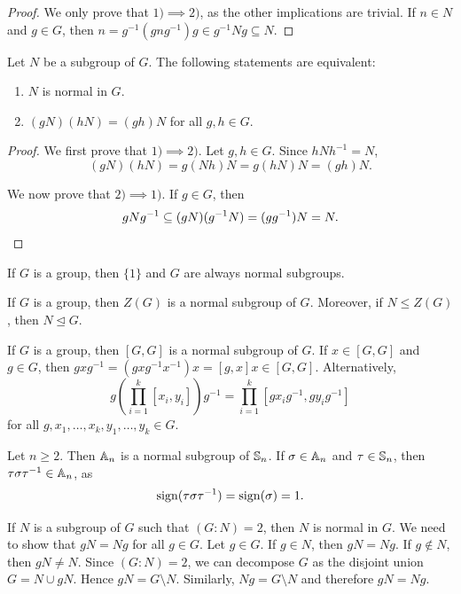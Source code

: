 \begin{proof}
We only prove that $1)\implies 2)$, as the other implications are trivial. If $n\in N$ and $g\in G$, then 
$n=g^{-1}(gng^{-1})g\in g^{-1}Ng\subseteq N$. 
\end{proof}

\begin{proposition}
    Let $N$ be a subgroup of $G$. The following statements
    are equivalent: 
    \begin{enumerate}
        \item $N$ is normal in $G$.
        \item $(gN)(hN)=(gh)N$ for all $g,h\in G$.
    \end{enumerate}
\end{proposition}

\begin{proof}
   We first prove that $1)\implies 2)$. Let $g,h\in G$. Since
   $hNh^{-1}=N$, 
   \[
   (gN)(hN)=g(Nh)N=g(hN)N=(gh)N.
   \]
   
   We now prove that $2)\implies1)$. If $g\in G$, then
    \[
    gNg^{-1}\subseteq (gN)(g^{-1}N)=(gg^{-1})N=N.\qedhere
    \]
\end{proof}

If $G$ is a group, then 
$\{1\}$ and $G$ are always normal subgroups. 

\begin{example}
If $G$ is a group, then $Z(G)$ is a normal subgroup of $G$. Moreover, 
if $N\leq Z(G)$, then $N\unlhd
G$.
\end{example}

\begin{example}
  If $G$ is a group, then  $[G,G]$ is a normal subgroup of $G$. If
  $x\in [G,G]$ and $g\in G$, then
  $gxg^{-1}=(gxg^{-1}x^{-1})x=[g,x]x\in [G,G]$. Alternatively,
  \[
    g\left(\prod_{i=1}^k[x_i,y_i]\right)g^{-1}=\prod_{i=1}^k [gx_ig^{-1},gy_ig^{-1}]
  \]
  for all $g,x_1,\dots,x_k,y_1,\dots,y_k\in G$.
\end{example}

\begin{example}
  Let $n\geq2$. Then
  $\mathbb{A}_n$ is a normal subgroup of $\mathbb{S}_n$.
  If $\sigma\in\mathbb{A}_n$ and $\tau\in\mathbb{S}_n$, then $\tau\sigma\tau^{-1}\in\mathbb{A}_n$, as
  \[
    \operatorname{sign}(\tau\sigma\tau^{-1})=\operatorname{sign}(\sigma)=1.
  \]
\end{example}

\begin{example}
If $N$ is a subgroup of $G$ such that $(G:N)=2$, then $N$ is normal in $G$. We need to show that $gN=Ng$ for all $g\in G$. Let $g\in G$. 
If $g\in N$, then $gN=Ng$. If $g\not\in N$, then
$gN\ne N$. Since $(G:N)=2$, we can decompose $G$ as 
the disjoint union $G=N\cup gN$. Hence 
$gN=G\setminus N$. Similarly, 
$Ng=G\setminus N$ and therefore $gN=Ng$.
\end{example}

